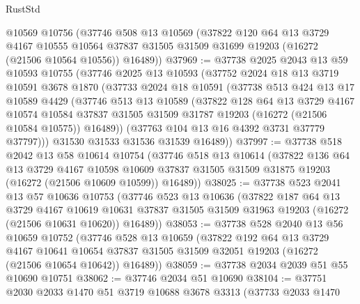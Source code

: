 \begin{lexlean}{RustStd}
\begin{coremodule}
    @10569
    @10756
    (@37746
      @508
      @13
      @10569
      (@37822
        @120
        @64
        @13
        @3729
        @4167
        @10555
        @10564
        @37837
        @31505
        @31509
        @31699
        @19203
        (@16272 (@21506 @10564 @10556))
        @16489))
@37969 := @37738
    @2025
    @2043
    @13
    @59
    @10593
    @10755
    (@37746
      @2025
      @13
      @10593
      (@37752
        @2024
        @18
        @13
        @3719
        @10591
        @3678
        @1870
        (@37733
          @2024
          @18
          @10591
          (@37738
            @513
            @424
            @13
            @17
            @10589
            @4429
            (@37746
              @513
              @13
              @10589
              (@37822
                @128
                @64
                @13
                @3729
                @4167
                @10574
                @10584
                @37837
                @31505
                @31509
                @31787
                @19203
                (@16272 (@21506 @10584 @10575))
                @16489))
            (@37763 @104 @13 @16 @4392 @3731 @37779 @37797)))
        @31530
        @31533
        @31536
        @31539
        @16489))
@37997 := @37738
    @518
    @2042
    @13
    @58
    @10614
    @10754
    (@37746
      @518
      @13
      @10614
      (@37822
        @136
        @64
        @13
        @3729
        @4167
        @10598
        @10609
        @37837
        @31505
        @31509
        @31875
        @19203
        (@16272 (@21506 @10609 @10599))
        @16489))
@38025 := @37738
    @523
    @2041
    @13
    @57
    @10636
    @10753
    (@37746
      @523
      @13
      @10636
      (@37822
        @187
        @64
        @13
        @3729
        @4167
        @10619
        @10631
        @37837
        @31505
        @31509
        @31963
        @19203
        (@16272 (@21506 @10631 @10620))
        @16489))
@38053 := @37738
    @528
    @2040
    @13
    @56
    @10659
    @10752
    (@37746
      @528
      @13
      @10659
      (@37822
        @192
        @64
        @13
        @3729
        @4167
        @10641
        @10654
        @37837
        @31505
        @31509
        @32051
        @19203
        (@16272 (@21506 @10654 @10642))
        @16489))
@38059 := @37738 @2034 @2039 @51 @55 @10690 @10751
@38062 := @37746 @2034 @51 @10690
@38104 := @37751
    @2030
    @2033
    @1470
    @51
    @3719
    @10688
    @3678
    @3313
    (@37733
      @2033
      @1470

\end{coremodule}
\end{lexlean}
